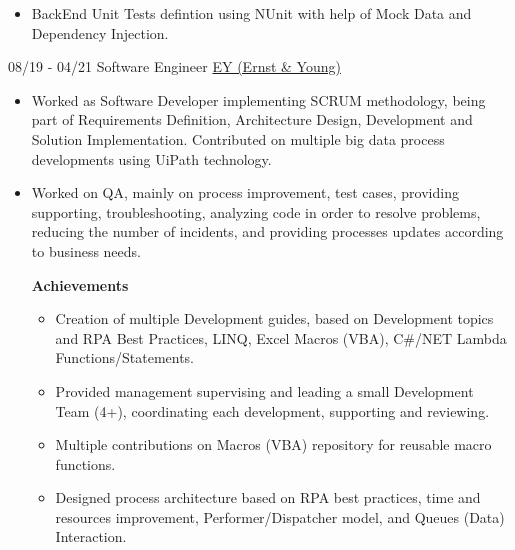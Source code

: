 \documentclass[letterpaper]{twentysecondcv} %
\begin{document}
\begin{twenty}
{\begin{itemize}
\begin{itemize}
                    \item BackEnd Unit Tests defintion using NUnit with help of Mock Data and Dependency Injection.
                    

                \end{itemize}
            \end{itemize}
        }

	    \twentyitem
    	{08/19 - 04/21}
        {Software Engineer}
        { \href{https://www.ey.com/es_cr}{EY (Ernst \& Young)} }
        {
            \begin{itemize}
                \item Worked as Software Developer implementing SCRUM methodology, being part of Requirements Definition, Architecture Design, Development and Solution Implementation. Contributed on multiple big data process developments using UiPath technology.
                
                \item Worked on QA, mainly on process improvement, test cases, providing supporting, troubleshooting, analyzing code in order to resolve problems, reducing the number of incidents, and providing processes updates according to business needs.
            
                \textbf{Achievements}
                \begin{itemize}
        
                    \item Creation of multiple Development guides, based on Development topics and RPA Best Practices, LINQ, Excel Macros (VBA), C\#/NET Lambda Functions/Statements.
                    
                    \item Provided management supervising and leading a small Development Team (4+), coordinating each development, supporting and reviewing.
                    
                    \item Multiple contributions on Macros (VBA) repository for reusable macro functions.
                    
                    \item Designed process architecture based on RPA best practices, time and resources improvement, Performer/Dispatcher model, and Queues (Data) Interaction.
                    

\end{itemize}
\end{itemize}}
\end{twenty}
\end{document}
